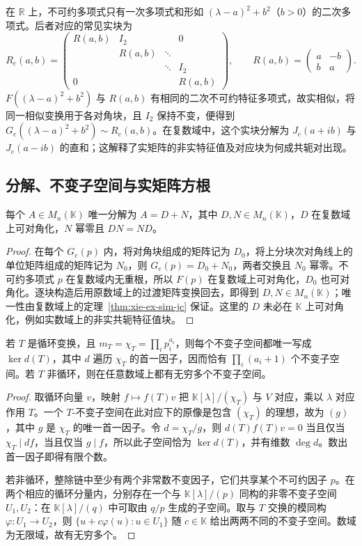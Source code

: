 在 $\mathbb R$ 上，不可约多项式只有一次多项式和形如 $(\lambda-a)^2+b^2$（$b>0$）的二次多项式。后者对应的常见实块为
\[
 R_e(a,b)=\begin{pmatrix}
 R(a,b)&I_2&&0\\&R(a,b)&\ddots&\\&&\ddots&I_2\\0&&&R(a,b)
 \end{pmatrix},
 \qquad R(a,b)=\begin{pmatrix}a&-b\\b&a\end{pmatrix}.
\]
$F((\lambda-a)^2+b^2)$ 与 $R(a,b)$ 有相同的二次不可约特征多项式，故实相似，将同一相似变换用于各对角块，且 $I_2$ 保持不变，便得到 $G_e((\lambda-a)^2+b^2)\sim R_e(a,b)$。在复数域中，这个实块分解为 $J_e(a+ib)$ 与 $J_e(a-ib)$ 的直和；这解释了实矩阵的非实特征值及对应块为何成共轭对出现。

\subsection{分解、不变子空间与实矩阵方根}

\begin{proposition}
\label{prop:xie-ex-sim-jc-general}
每个 $A\in M_n(\mathbb K)$ 唯一分解为 $A=D+N$，其中 $D,N\in M_n(\mathbb K)$，$D$ 在复数域上可对角化，$N$ 幂零且 $DN=ND$。
\end{proposition}
\begin{proof}
在每个 $G_e(p)$ 内，将对角块组成的矩阵记为 $D_0$，将上分块次对角线上的单位矩阵组成的矩阵记为 $N_0$，则 $G_e(p)=D_0+N_0$，两者交换且 $N_0$ 幂零。不可约多项式 $p$ 在复数域内无重根，所以 $F(p)$ 在复数域上可对角化，$D_0$ 也可对角化。逐块构造后用原数域上的过渡矩阵变换回去，即得到 $D,N\in M_n(\mathbb K)$；唯一性由复数域上的定理~\ref{thm:xie-ex-sim-jc} 保证。这里的 $D$ 未必在 $\mathbb K$ 上可对角化，例如实数域上的非实共轭特征值块。
\end{proof}

\begin{proposition}
\label{prop:xie-ex-sim-invariant-count-general}
若 $T$ 是循环变换，且 $m_T=\chi_T=\prod_i p_i^{a_i}$，则每个不变子空间都唯一写成 $\ker d(T)$，其中 $d$ 遍历 $\chi_T$ 的首一因子，因而恰有 $\prod_i(a_i+1)$ 个不变子空间。若 $T$ 非循环，则在任意数域上都有无穷多个不变子空间。
\end{proposition}
\begin{proof}
取循环向量 $v$，映射 $f\mapsto f(T)v$ 把 $\mathbb K[\lambda]/(\chi_T)$ 与 $V$ 对应，乘以 $\lambda$ 对应作用 $T$。一个 $T$-不变子空间在此对应下的原像是包含 $(\chi_T)$ 的理想，故为 $(g)$，其中 $g$ 是 $\chi_T$ 的唯一首一因子。令 $d=\chi_T/g$，则 $d(T)f(T)v=0$ 当且仅当 $\chi_T\mid df$，当且仅当 $g\mid f$，所以此子空间恰为 $\ker d(T)$，并有维数 $\deg d$。数出首一因子即得有限个数。

若非循环，整除链中至少有两个非常数不变因子，它们共享某个不可约因子 $p$。在两个相应的循环分量内，分别存在一个与 $\mathbb K[\lambda]/(p)$ 同构的非零不变子空间 $U_1,U_2$：在 $\mathbb K[\lambda]/(q)$ 中可取由 $q/p$ 生成的子空间。取与 $T$ 交换的模同构 $\varphi:U_1\to U_2$，则 $\{u+c\varphi(u):u\in U_1\}$ 随 $c\in\mathbb K$ 给出两两不同的不变子空间。数域为无限域，故有无穷多个。
\end{proof}

